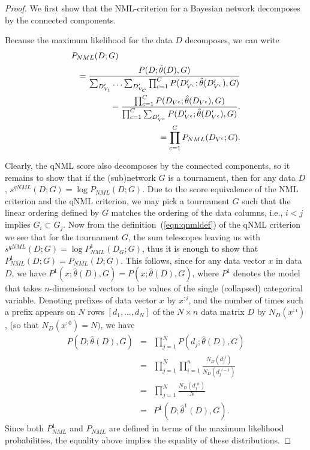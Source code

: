 \begin{proof}
We first show that the NML-criterion for a Bayesian network
decomposes by the connected components.

Because the maximum likelihood for the data $D$ decomposes,
we can write
\begin{eqnarray}
  \lefteqn{P_{NML}(D;G)} \nonumber \\
  && = \frac{P(D;\hat\theta(D),G)}
            {\sum_{D'_{V_1}}\ldots \sum_{D'_{V_C}}\prod_{c=1}^C P(D'_{V^c};\hat\theta(D'_{V^c}),G)} \nonumber \\
            && = \frac{\prod_{c=1}^C P(D_{V^c};\hat\theta(D_{V^c}),G)} 
            {\prod_{c=1}^C\sum_{D'_{V^c}}P(D'_{V^c};\hat\theta(D'_{V^c}),G)}.\nonumber \\
            && = \prod_{c=1}^CP_{NML}(D_{V^c};G).
\end{eqnarray}

Clearly, the qNML score also decomposes by the connected components,
so it remains to show that if the (sub)network $G$ is a tournament,
then for any data $D$, $s^{qNML}(D;G)=\log P_{NML}(D;G)$.  Due to the
score equivalence of the NML criterion and the qNML criterion, we may
pick a tournament $G$ such that the linear ordering defined by $G$
matches the ordering of the data columns, i.e., $i<j$ implies $G_i
\subset G_j$. Now from the definition~(\ref{eqn:qnmldef}) of the qNML
criterion we see that for the tournament $G$, the sum telescopes
leaving us with $s^{qNML}(D;G) = \log P^1_{NML}(D_G;G)$, thus
it is enough to show that $P^1_{NML}(D;G)=P_{NML}(D;G)$.  This
follows, since for any data vector $x$ in data $D$, we have
$P^1(x;\hat\theta(D),G) = P(x;\hat\theta(D),G)$, where $P^1$ denotes
the model that takes $n$-dimensional vectors to be values of the
single (collapsed) categorical variable.  Denoting prefixes of data
vector $x$ by $x^{:i}$, and the number of times such a prefix appears
on $N$ rows $[d_1,\ldots,d_N]$ of the $N\times n$ data matrix $D$ by
$N_D(x^{:i})$, (so that $N_D(x^{:0})=N)$, we have
\begin{eqnarray}
  P(D;\hat\theta(D),G) &=& \prod_{j=1}^{N}P(d_j;\hat\theta(D),G) \nonumber \\
  &=& \prod_{j=1}^{N} \prod_{i=1}^{n} \frac{N_D(d_j^{:i})}{N_D(d_j^{:i-1})} \nonumber\\
  &=& \prod_{j=1}^{N} \frac{N_D(d_j^{:n})}{N} \nonumber \\
  &=& P^1(D;\hat\theta^1(D),G).
\end{eqnarray}
Since both $P^1_{NML}$ and $P_{NML}$ are defined in terms of the
maximum likelihood probabilities, the equality above implies the equality
of these distributions.
\end{proof}

